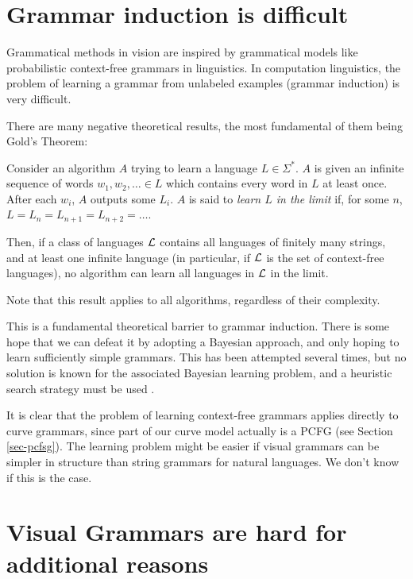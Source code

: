 \section{Grammar induction is difficult}
\label{sec-gram-hard}

Grammatical methods in vision are inspired by grammatical models like
probabilistic context-free grammars in linguistics. In computation
linguistics, the problem of learning a grammar from unlabeled examples
(grammar induction) is very difficult.

There are many \cite{lee-induction} negative theoretical results, the
most fundamental of them being Gold's Theorem:

\begin{thm}
Consider an algorithm $A$ trying to learn a language $L\in \Sigma^*$.
$A$ is given an infinite sequence of words $w_1, w_2, \dots\in L$ which
contains every word in $L$ at least once. After each $w_i$, $A$
outputs some $L_i$. $A$ is said to {\em learn $L$ in the limit} if,
for some $n$, $L = L_n = L_{n+1} = L_{n+2} = \dots$.

Then, if a class of languages ${\mathcal L}$ contains all languages of
finitely many strings, and at least one infinite language (in
particular, if ${\mathcal L}$ is the set of context-free languages), no
algorithm can learn all languages in ${\mathcal L}$ in the limit.
\end{thm}
Note that this result applies to all algorithms, regardless of their
complexity. 

This is a fundamental theoretical barrier to grammar induction. There
is some hope that we can defeat it by adopting a Bayesian approach,
and only hoping to learn sufficiently simple grammars. This has been
attempted several times, but no solution is known for the associated
Bayesian learning problem, and a heuristic search strategy must be
used \cite{cook, stolcke, nevill-manning}.

It is clear that the problem of learning context-free grammars applies
directly to curve grammars, since part of our curve model actually is
a PCFG (see Section \ref{sec-pcfsg}). The learning problem might be
easier if visual grammars can be simpler in structure than string
grammars for natural languages. We don't know if this is the case.

\section{Visual Grammars are hard for additional reasons}

